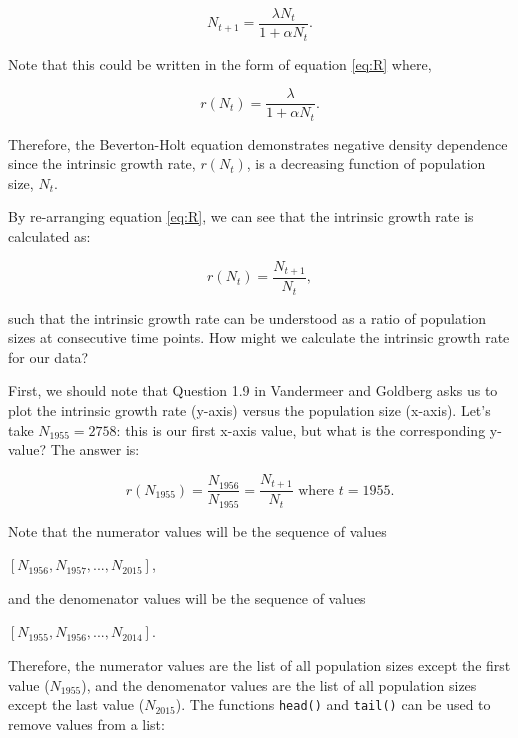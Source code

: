 \documentclass[]{book}
\newenvironment{Shaded}{\begin{snugshade}}{\end{snugshade}}
\newcommand{\KeywordTok}[1]{\textcolor[rgb]{0.13,0.29,0.53}{\textbf{{#1}}}}
\newcommand{\DecValTok}[1]{\textcolor[rgb]{0.00,0.00,0.81}{{#1}}}
\newcommand{\FloatTok}[1]{\textcolor[rgb]{0.00,0.00,0.81}{{#1}}}
\newcommand{\StringTok}[1]{\textcolor[rgb]{0.31,0.60,0.02}{{#1}}}
\newcommand{\NormalTok}[1]{{#1}}
\begin{document}
\[
N_{t+1} = \frac{\lambda N_t}{1+\alpha N_t}.
\]

Note that this could be written in the form of equation \eqref{eq:R}
where,

\begin{equation}
r(N_t) = \frac{\lambda}{1+\alpha N_t}.
\end{equation}

Therefore, the Beverton-Holt equation demonstrates negative density
dependence since the intrinsic growth rate, \(r(N_t)\), is a decreasing
function of population size, \(N_t\).

By re-arranging equation \eqref{eq:R}, we can see that the intrinsic
growth rate is calculated as:

\[
r(N_t) = \frac{N_{t+1}}{N_t},
\]

such that the intrinsic growth rate can be understood as a ratio of
population sizes at consecutive time points. How might we calculate the
intrinsic growth rate for our data?

First, we should note that Question 1.9 in Vandermeer and Goldberg asks
us to plot the intrinsic growth rate (y-axis) versus the population size
(x-axis). Let's take \(N_{1955} = 2758\): this is our first x-axis
value, but what is the corresponding y-value? The answer is:

\[
r(N_{1955}) = \frac{N_{1956}}{N_{1955}} = \frac{N_{t+1}}{N_t} \mbox{ where $t = 1955$}.
\]

Note that the numerator values will be the sequence of values

\([N_{1956}, N_{1957}, ..., N_{2015}]\),

and the denomenator values will be the sequence of values

\([N_{1955}, N_{1956}, ..., N_{2014}]\).

Therefore, the numerator values are the list of all population sizes
except the first value (\(N_{1955}\)), and the denomenator values are
the list of all population sizes except the last value (\(N_{2015}\)).
The functions \texttt{head()} and \texttt{tail()} can be used to remove
values from a list:

\begin{Shaded}
\end{Shaded}
\end{document}
